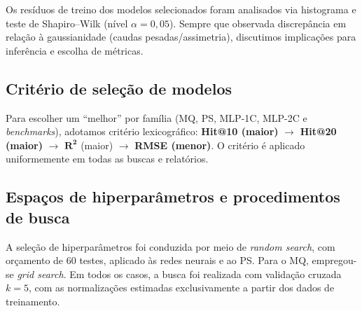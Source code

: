 Os resíduos de treino dos modelos selecionados foram analisados via histograma e teste de Shapiro--Wilk (nível $\alpha=0{,}05$). Sempre que observada discrepância em relação à gaussianidade (caudas pesadas/assimetria), discutimos implicações para inferência e escolha de métricas.

\subsection{Critério de seleção de modelos}
Para escolher um ``melhor'' por família (MQ, PS, MLP-1C, MLP-2C e \emph{benchmarks}), 
adotamos critério lexicográfico: 
\textbf{Hit@10 (maior)} $\to$ \textbf{Hit@20 (maior)} $\to$ $\mathbf{R^2}$ (maior) $\to$ \textbf{RMSE (menor)}. 
O critério é aplicado uniformemente em todas as buscas e relatórios.

\subsection{Espaços de hiperparâmetros e procedimentos de busca}
A seleção de hiperparâmetros foi conduzida por meio de \textit{random search}, com orçamento de 60 testes, aplicado às redes neurais e ao PS. Para o MQ, empregou-se \textit{grid search}. Em todos os casos, a busca foi realizada com validação cruzada $k=5$, com as normalizações estimadas exclusivamente a partir dos dados de treinamento.



